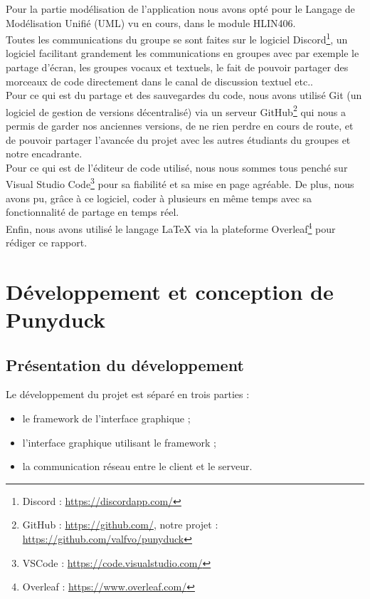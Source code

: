 \documentclass[twoside]{report}
\begin{document}
Pour la partie modélisation de l'application nous avons opté pour le Langage de Modélisation Unifié (UML) vu en cours, dans le module HLIN406. \\

Toutes les communications du groupe se sont faites sur le logiciel Discord\footnote{Discord : \url{https://discordapp.com/}}, un logiciel facilitant grandement les communications en groupes avec par exemple le partage d'écran, les groupes vocaux et textuels, le fait de pouvoir partager des morceaux de code directement dans le canal de discussion textuel etc.. \\

Pour ce qui est du partage et des sauvegardes du code, nous avons utilisé Git (un logiciel de gestion de versions décentralisé) via un serveur GitHub\footnote{GitHub : \url{https://github.com/}, notre projet : \url{https://github.com/valfvo/punyduck}} qui nous a permis de garder nos anciennes versions, de ne rien perdre en cours de route, et de pouvoir partager l'avancée du projet avec les autres étudiants du groupes et notre encadrante. \\

Pour ce qui est de l'éditeur de code utilisé, nous nous sommes tous penché sur Visual Studio Code\footnote{VSCode : \url{https://code.visualstudio.com/}} pour sa fiabilité et sa mise en page agréable. De plus, nous avons pu, grâce à ce logiciel, coder à plusieurs en même temps avec sa fonctionnalité de partage en temps réel. \\

Enfin, nous avons utilisé le langage \LaTeX{} via la plateforme Overleaf\footnote{Overleaf : \url{https://www.overleaf.com/}} pour rédiger ce rapport.

\chapter{Développement et conception de Punyduck}
\section{Présentation du développement}
Le développement du projet est séparé en trois parties : 
\begin{itemize}[label=$-$, leftmargin=1.5cm]
    \item le framework de l'interface graphique ;
    \item l'interface graphique utilisant le framework ;
    \item la communication réseau entre le client et le serveur.
\end{itemize}
\end{document}
